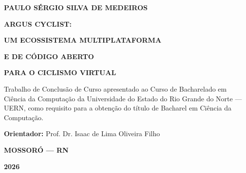 
\begin{folhaderosto}
  \begin{center}
    \textbf{\large PAULO SÉRGIO SILVA DE MEDEIROS}
    \vspace{3.5cm}
    \par
    \textbf{\Large ARGUS CYCLIST:}
    \par
    \textbf{\Large UM ECOSSISTEMA MULTIPLATAFORMA}
    \par
    \textbf{\Large E DE CÓDIGO ABERTO}
    \par
    \textbf{\Large PARA O CICLISMO VIRTUAL}
    \vspace{1.5cm}
    \par
    \hfill
    \begin{minipage}{0.45\textwidth}
      \small
      Trabalho de Conclusão de Curso apresentado ao Curso de Bacharelado em
      Ciência da Computação da Universidade do Estado do Rio Grande do Norte
      --- UERN, como requisito para a obtenção do título de Bacharel em
      Ciência da Computação.
      \vspace{0.5cm}
      \par
      \textbf{Orientador:} Prof. Dr. Isaac de Lima Oliveira Filho
    \end{minipage}
    \vfill
    \textbf{MOSSORÓ --- RN}
    \par
    \textbf{2026}
  \end{center}
\end{folhaderosto}
